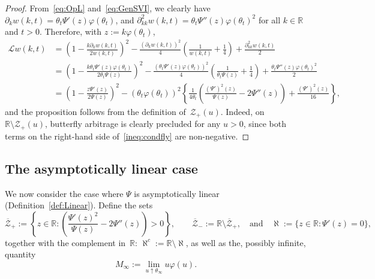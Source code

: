 \documentclass{amsart}[11pt]
\numberwithin{equation}{section}
\theoremstyle{definition}
\newcommand{\RR}{\mathbb{R}}
\newcommand{\Ll}{\mathcal{L}}
\newcommand{\Zz}{\mathcal{Z}}
\begin{document}
\begin{proof}
From~\eqref{eq:OpL} and~\eqref{eq:GenSVI}, we clearly have
$\partial_kw(k,t)=\theta_t\Psi'(z)\varphi(\theta_t)$, and 
$\partial^2_{kk}w(k,t)=\theta_t\Psi''(z)\varphi(\theta_t)^2$
for all $k\in\RR$ and $t>0$.
Therefore, with $z:=k\varphi(\theta_t)$, 
\begin{align}
\Ll w (k,t) & = \left(1-\frac{k\partial_kw(k,t)}{2w(k,t)}\right)^2-\frac{(\partial_k w(k,t))^2}{4}\left(\frac{1}{w(k,t)}+\frac{1}{4}\right)+\frac{\partial_{kk}^2w(k,t)}{2}\nonumber\\
 & = \left(1-\frac{k\theta_t\Psi'(z)\varphi(\theta_t)}{2\theta_t\Psi(z)}\right)^2-\frac{(\theta_t\Psi'(z)\varphi(\theta_t))^2}{4}\left(\frac{1}{\theta_t\Psi(z)}+\frac{1}{4}\right)+\frac{\theta_t\Psi''(z)\varphi(\theta_t)^2}{2}\nonumber\\
 & = \left(1-\frac{z\Psi'(z)}{2\Psi(z)}\right)^2-(\theta_t \varphi(\theta_t))^2 
\left\{\frac{1}{4 \theta_t} \left(\frac{(\Psi') ^{2}(z)}{\Psi(z)}-2\Psi''(z)\right)+\frac{(\Psi')^{2}(z)}{16}\right\},\label{ineq:condfly}
\end{align}
and the proposition follows from the definition of~$\Zz_+(u)$.
Indeed, on~$\RR\setminus \Zz_+(u)$, butterfly arbitrage is clearly precluded for any $u>0$, since both terms on the right-hand side of~\eqref{ineq:condfly} are non-negative.
\end{proof}



\subsection{The asymptotically linear case} \label{sec:Linear}
We now consider the case where $\Psi$ is asymptotically linear (Definition~\ref{def:Linear}). 
Define the sets
\begin{equation}\label{eq:SetZBarP}
\overline{\Zz}_+ := \left\{z \in \mathbb{R}: \left(\frac{\Psi' (z)^{2}}{\Psi(z)}-2\Psi''(z)\right) > 0\right\},
\qquad
\overline{\Zz}_-:=\mathbb{R}\setminus \overline{\Zz}_+,
\quad\text{and}\quad
\aleph:= \{z\in\RR: \Psi'(z) = 0\},
\end{equation}
together with the complement in~$\RR$: $\aleph^c := \RR\setminus\aleph$, as well as the,
possibly infinite, quantity
\begin{equation}\label{eq:Minf}
M_\infty:=\lim_{u\uparrow \theta_\infty}u \varphi(u).
\end{equation}
\end{document}
